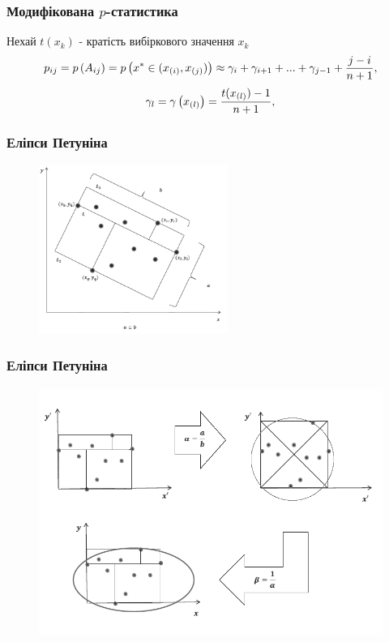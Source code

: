 \documentclass[mathserif,serif,10pt]{beamer}
\begin{document}
\begin{frame}
\frametitle{Модифікована $p$-статистика}
Нехай $t(x_k)$ - кратість вибіркового значення $x_k$
\[
p_{ij}=p\left(A_{ij}\right)=p\left(x^{*} \in (x_{(i)}, x_{(j)})\right) \approx
\gamma_i + \gamma_{i+1} + ... + \gamma_{j-1} + {{j-i}\over{n+1}},
\]
\[\gamma_{l} = \gamma \left(x_{(l)}\right) = {{t(x_{(l)})-1}\over{n+1}},\]
\end{frame}

\begin{frame}
\frametitle{Еліпси Петуніна}
\begin{figure}[h!]
\centering
\includegraphics[width=0.55\textwidth]{pet1}
\end{figure}
\end{frame}

\begin{frame}
\frametitle{Еліпси Петуніна}
\begin{figure}[h!]
\centering
\includegraphics[width=1.0\textwidth]{pet2}
\end{figure}
\end{frame}
\end{document}
